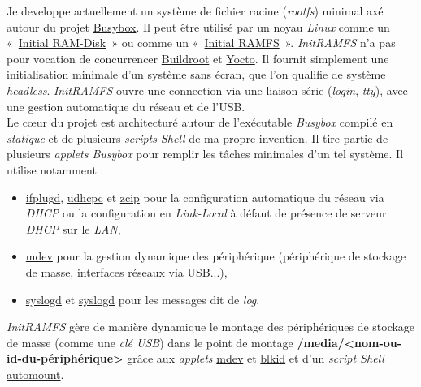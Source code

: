 \documentclass[a4paper]{article}
\begin{document}
Je developpe actuellement un système de fichier racine (\textit{rootfs}) minimal axé autour du projet \href{http://www.busybox.net/}{Busybox}. Il peut être utilisé par un noyau \textit{Linux} comme un «~\href{https://www.kernel.org/doc/Documentation/initrd.txt}{Initial RAM-Disk}~» ou comme un «~\href{https://www.kernel.org/doc/Documentation/filesystems/ramfs-rootfs-initramfs.txt}{Initial RAMFS}~». \textit{InitRAMFS} n'a pas pour vocation de concurrencer \href{http://buildroot.org/}{Buildroot} et \href{https://www.yoctoproject.org/}{Yocto}. Il fournit simplement une initialisation minimale d'un système sans écran, que l'on qualifie de système \textit{headless}. \textit{InitRAMFS} ouvre une connection via une liaison série (\textit{login}, \textit{tty}), avec une gestion automatique du réseau et de l'USB.\\

Le c\oe{}ur du projet est architecturé autour de l'exécutable \textit{Busybox} compilé en \textit{statique} et de plusieurs \textit{scripts Shell} de ma propre invention. Il tire partie de plusieurs \textit{applets Busybox} pour remplir les tâches minimales d'un tel système. Il utilise notamment :
\begin{itemize}
\item \href{http://www.busybox.net/downloads/BusyBox.html#ifplugd}{ifplugd}, \href{http://www.busybox.net/downloads/BusyBox.html#udhcpc}{udhcpc} et \href{http://www.busybox.net/downloads/BusyBox.html#zcip}{zcip} pour la configuration automatique du réseau via \textit{DHCP} ou la configuration en \textit{Link-Local} à défaut de présence de serveur \textit{DHCP} sur le \textit{LAN},
\item \href{http://www.busybox.net/downloads/BusyBox.html#mdev}{mdev} pour la gestion dynamique des périphérique (périphérique de stockage de masse, interfaces réseaux via USB...),
\item \href{http://www.busybox.net/downloads/BusyBox.html#syslogd}{syslogd} et \href{http://www.busybox.net/downloads/BusyBox.html#klogd}{syslogd} pour les messages dit de \textit{log}.
\end{itemize}

\textit{InitRAMFS} gère de manière dynamique le montage des périphériques de stockage de masse (comme une \textit{clé USB}) dans le point de montage \textbf{/media/<nom-ou-id-du-périphérique>} grâce aux \textit{applets} \href{http://www.busybox.net/downloads/BusyBox.html#mdev}{mdev} et \href{http://www.busybox.net/downloads/BusyBox.html#blkid}{blkid} et d'un \textit{script Shell} \href{https://github.com/gazoo74/initramfs/blob/old-fixes-and-dev-need-study/packages-initramfs/mdev/usr/sbin/automount}{automount}.\\
\end{document}
